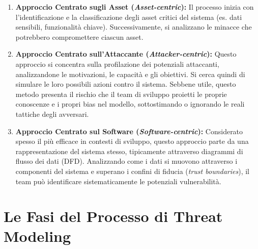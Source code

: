 \begin{enumerate}
    \item \textbf{Approccio Centrato sugli Asset (\textit{Asset-centric}):} Il processo inizia con l'identificazione e la classificazione degli asset critici del sistema (es. dati sensibili, funzionalità chiave). Successivamente, si analizzano le minacce che potrebbero compromettere ciascun asset.
    \item \textbf{Approccio Centrato sull'Attaccante (\textit{Attacker-centric}):} Questo approccio si concentra sulla profilazione dei potenziali attaccanti, analizzandone le motivazioni, le capacità e gli obiettivi. Si cerca quindi di simulare le loro possibili azioni contro il sistema. Sebbene utile, questo metodo presenta il rischio che il team di sviluppo proietti le proprie conoscenze e i propri bias nel modello, sottostimando o ignorando le reali tattiche degli avversari.
    \item \textbf{Approccio Centrato sul Software (\textit{Software-centric}):} Considerato spesso il più efficace in contesti di sviluppo, questo approccio parte da una rappresentazione del sistema stesso, tipicamente attraverso diagrammi di flusso dei dati (DFD). Analizzando come i dati si muovono attraverso i componenti del sistema e superano i confini di fiducia (\textit{trust boundaries}), il team può identificare sistematicamente le potenziali vulnerabilità.
\end{enumerate}

\section{Le Fasi del Processo di Threat Modeling}




